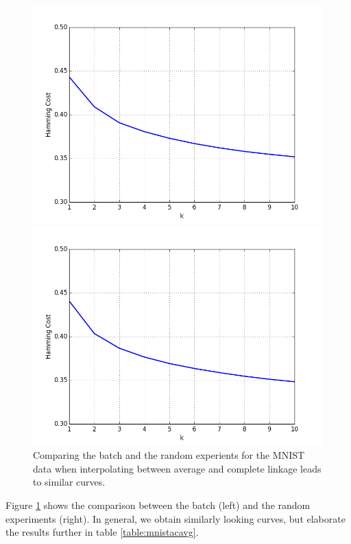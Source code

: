 \begin{figure}[h]
\begin{minipage}{.45\textwidth}
  \includegraphics[width=\linewidth]{plots/mnist-ac-top-10}
\end{minipage}
\begin{minipage}{.45\textwidth}
  \centering
  \includegraphics[width=\linewidth]{plots/mnist-ac-random-top-10}
\end{minipage}
\caption{Comparing the batch and the random experients for the MNIST data when interpolating between average and complete linkage leads to similar curves.}
\label{fig:mnistacavg}
\end{figure}

Figure \ref{fig:mnistacavg} shows the comparison between the batch (left) and the random experiments (right). In general, we obtain similarly looking curves, but elaborate the results further in table \ref{table:mnistacavg}.

